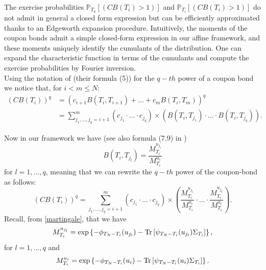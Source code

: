 The exercise probabilities $\mathbb{P}_{T_{k}}\left[\left(CB(T_{i})>1\right)\right]$ and $\mathbb{P}_{T_{i}}\left[\left(CB(T_{i})>1\right)\right]$ do not admit in general a closed form expression but can be efficiently approximated thanks to an Edgeworth expansion procedure. Intuitively, the moments of the coupon bonds admit a simple closed-form expression in our affine framework, and these moments uniquely identify the cumulants of the distribution. One can expand the characteristic function in terms of the cumulants and compute the exercise probabilities by Fourier inversion.\\

Using the notation of \cite{article_CollinDufresneGoldstein2002} (their formula (5)) for the $q-th$ power of a coupon bond we notice that, for $i<m\leq N$:
\begin{align}
\left( CB(T_{i})\right)^{q}&=\left(c_{i+1}B(T_{i},T_{i+1})+...+c_{m}B(T_{i},T_{m}) \right)^{q}\nonumber\\
&=\sum_{j_{1},...,j_{q}=i+1}^{m}{\left(c_{j_{1}}\cdot...\cdot c_{j_{q}} \right)\times\left(B(T_{i},T_{j_{1}})\cdot...\cdot B(T_{i},T_{j_{q}}) \right)}.
\end{align}

Now in our framework we have (see also formula (7.9) in \cite{article_KRPT2009})
\begin{equation}
B(T_{i},T_{j_l})=\frac{M^{u_{j_l}}_{T_{i}}}{M^{u_{i}}_{T_{i}}}
\end{equation}
for $l=1,...,q$, meaning that we can rewrite the $q-th$ power of the coupon-bond as follows:
\begin{equation}
\left( CB(T_{i})\right)^{q}=\sum_{j_{1},...,j_{q}=i+1}^{m}{\left(c_{j_{1}}\cdot...\cdot c_{j_{q}} \right)\times\left(\frac{M^{u_{j_{1}}}_{T_{i}}}{M^{u_i}_{T_{i}}}\cdot...\cdot \frac{M^{u_{j_{q}}}_{T_{i}}}{M^{u_i}_{T_{i}}} \right)}.
\end{equation}
Recall, from \eqref{martingale}, that we have
\begin{equation}
M^{u_{j_{l}}}_{T_{i}}=\exp \left\{-\phi_{T_{N}-T_{i}}(u_{j_{l}})-\textup{Tr}\left[ \psi_{T_{N}-T_{i}}(u_{j_{l}})\Sigma_{T_{i}}\right] \right\},
\end{equation}
for $l=1,...,q$ and
\begin{equation}
M^{u_{i}}_{T_{i}}=\exp \left\{-\phi_{T_{N}-T_{i}}(u_{i})-\textup{Tr}\left[ \psi_{T_{N}-T_{i}}(u_{i})\Sigma_{T_{i}}\right] \right\}.
\end{equation}

